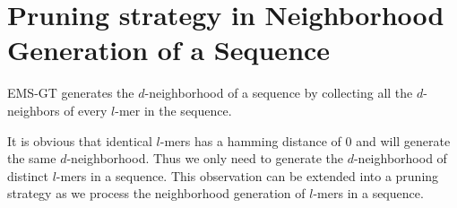 \section{Pruning strategy in Neighborhood Generation of a Sequence}
EMS-GT generates the $d$-neighborhood of a sequence by collecting all the $d$-neighbors of every $l$-mer in the sequence. 

It is obvious that identical $l$-mers has a hamming distance of 0 and will generate the same $d$-neighborhood. Thus we only need to generate the $d$-neighborhood of distinct $l$-mers in a sequence. This observation can be extended into a pruning strategy as we process the neighborhood generation of $l$-mers in a sequence.

